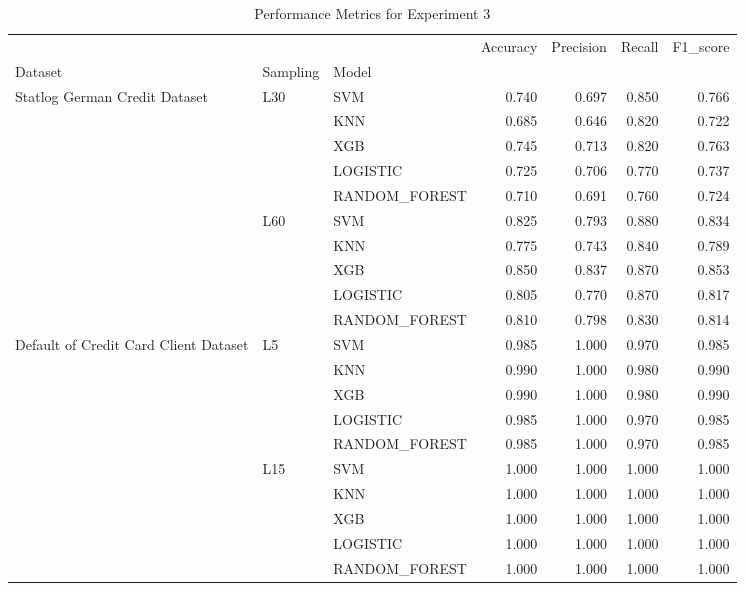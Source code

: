 \begin{table}
\caption{Performance Metrics for Experiment 3}
\label{tab:experiment_3_results}
\begin{tabular}{lllrrrr}
\toprule
 &  &  & Accuracy & Precision & Recall & F1\_score \\
Dataset & Sampling & Model &  &  &  &  \\
\midrule
\multirow[t]{10}{*}{Statlog German Credit Dataset} & \multirow[t]{5}{*}{L30} & SVM & 0.740 & 0.697 & 0.850 & 0.766 \\
 &  & KNN & 0.685 & 0.646 & 0.820 & 0.722 \\
 &  & XGB & 0.745 & 0.713 & 0.820 & 0.763 \\
 &  & LOGISTIC & 0.725 & 0.706 & 0.770 & 0.737 \\
 &  & RANDOM\_FOREST & 0.710 & 0.691 & 0.760 & 0.724 \\
\cline{2-7}
 & \multirow[t]{5}{*}{L60} & SVM & 0.825 & 0.793 & 0.880 & 0.834 \\
 &  & KNN & 0.775 & 0.743 & 0.840 & 0.789 \\
 &  & XGB & 0.850 & 0.837 & 0.870 & 0.853 \\
 &  & LOGISTIC & 0.805 & 0.770 & 0.870 & 0.817 \\
 &  & RANDOM\_FOREST & 0.810 & 0.798 & 0.830 & 0.814 \\
\cline{1-7} \cline{2-7}
\multirow[t]{10}{*}{Default of Credit Card Client Dataset} & \multirow[t]{5}{*}{L5} & SVM & 0.985 & 1.000 & 0.970 & 0.985 \\
 &  & KNN & 0.990 & 1.000 & 0.980 & 0.990 \\
 &  & XGB & 0.990 & 1.000 & 0.980 & 0.990 \\
 &  & LOGISTIC & 0.985 & 1.000 & 0.970 & 0.985 \\
 &  & RANDOM\_FOREST & 0.985 & 1.000 & 0.970 & 0.985 \\
\cline{2-7}
 & \multirow[t]{5}{*}{L15} & SVM & 1.000 & 1.000 & 1.000 & 1.000 \\
 &  & KNN & 1.000 & 1.000 & 1.000 & 1.000 \\
 &  & XGB & 1.000 & 1.000 & 1.000 & 1.000 \\
 &  & LOGISTIC & 1.000 & 1.000 & 1.000 & 1.000 \\
 &  & RANDOM\_FOREST & 1.000 & 1.000 & 1.000 & 1.000 \\
\cline{1-7} \cline{2-7}
\bottomrule
\end{tabular}
\end{table}
